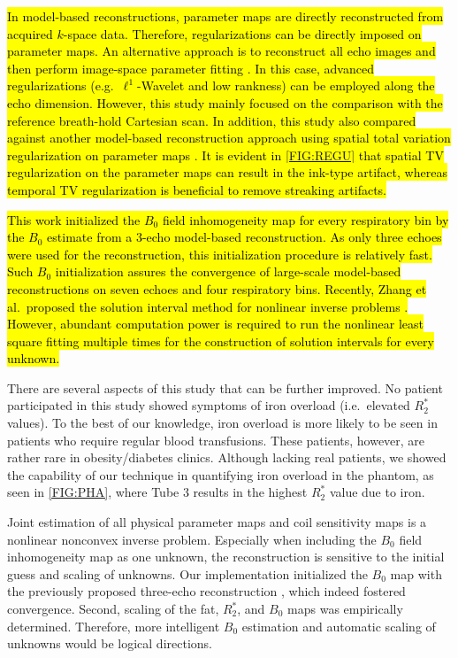 \documentclass[journal,twoside,web]{ieeecolor}
\begin{document}
\hl{In model-based reconstructions, parameter maps are directly reconstructed 
from acquired $k$-space data. 
Therefore, regularizations can be directly imposed on parameter maps. 
An alternative approach is to reconstruct all echo images 
and then perform image-space parameter fitting 
\mbox{\cite{armstrong_2018_fat,zhong_2020_r2sclinic,zhong_2020_resr2s,wang_2022_mt-me,starekova_2022_fb-fat}}.
In this case, advanced regularizations (e.g.~$\ell^1$-Wavelet and low rankness) 
can be employed along the echo dimension. 
However, this study mainly focused on the comparison 
with the reference breath-hold Cartesian scan. 
In addition, this study also compared against another model-based reconstruction approach 
using spatial total variation regularization on parameter maps \mbox{\cite{schneider_2020_mobawfr2s}}. 
It is evident in \mbox{\cref{FIG:REGU}} that spatial TV regularization on the parameter maps 
can result in the ink-type artifact, whereas temporal TV regularization is beneficial to remove 
streaking artifacts.
}


\hl{This work initialized the $B_0$ field inhomogeneity map for every respiratory bin 
by the $B_0$ estimate from a 3-echo model-based reconstruction. 
As only three echoes were used for the reconstruction, 
this initialization procedure is relatively fast. 
Such $B_0$ initialization assures the convergence of large-scale model-based reconstructions 
on seven echoes and four respiratory bins. 
Recently, Zhang et al.~proposed the solution interval method for nonlinear inverse problems 
\mbox{\cite{zhang_2021_nlls_init}}. 
However, abundant computation power is required to 
run the nonlinear least square fitting multiple times 
for the construction of solution intervals for every unknown.}

There are several aspects of this study that can be further improved. 
No patient participated in this study 
showed symptoms of iron overload (i.e.~elevated $R_2^*$ values). 
To the best of our knowledge, iron overload is more likely to be seen 
in patients who require regular blood transfusions. 
These patients, however, are rather rare in obesity/diabetes clinics. 
Although lacking real patients, we showed the capability of our technique in 
quantifying iron overload in the phantom, as seen in \cref{FIG:PHA}, 
where Tube 3 results in the highest $R_2^*$ value due to iron. 

Joint estimation of all physical parameter maps 
and coil sensitivity maps is a nonlinear nonconvex inverse problem. 
Especially when including the $B_0$ field inhomogeneity map as one unknown, 
the reconstruction is sensitive to the initial guess and scaling of unknowns. 
Our implementation initialized the $B_0$ map 
with the previously proposed three-echo reconstruction \cite{tan_2019_mobawf}, 
which indeed fostered convergence. 
Second, scaling of the fat, $R_2^*$, and $B_0$ maps was 
empirically determined. Therefore, more intelligent $B_0$ estimation 
and automatic scaling of unknowns \cite{tan_2017_scalemobaflow} 
would be logical directions. 
\end{document}
